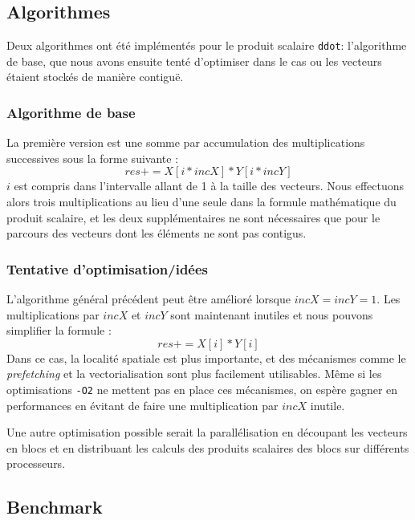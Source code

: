 \subsection{Algorithmes}

Deux algorithmes ont été implémentés pour le produit scalaire \texttt{ddot}: l'algorithme de base, que nous avons ensuite tenté d'optimiser dans le cas ou les vecteurs étaient stockés de manière contiguë.
    
\subsubsection{Algorithme de base}

La première version est une somme par accumulation des multiplications successives sous la forme suivante :
\begin{equation}
    res += X[i*incX]*Y[i*incY]
\end{equation}
$i$ est compris dans l'intervalle allant de 1 à la taille des vecteurs. Nous effectuons alors trois multiplications au lieu d'une seule dans la formule mathématique du produit scalaire, et les deux supplémentaires ne sont nécessaires que pour le parcours des vecteurs dont les éléments ne sont pas contigus.

\subsubsection{Tentative d'optimisation/idées}

L'algorithme général précédent peut être amélioré lorsque $incX = incY = 1$. Les multiplications par $incX$ et $incY$ sont maintenant inutiles et nous pouvons simplifier la formule :
\begin{equation}
    res += X[i]*Y[i]
\end{equation}
Dans ce cas, la localité spatiale est plus importante, et des mécanismes comme le \emph{prefetching} et la vectorialisation sont plus facilement utilisables. Même si les optimisations \texttt{-O2} ne mettent pas en place ces mécanismes, on espère gagner en performances en évitant de faire une multiplication par $incX$ inutile.
    
Une autre optimisation possible serait la parallélisation en découpant les vecteurs en blocs et en distribuant les calculs des produits scalaires des blocs sur différents processeurs.



\subsection{Benchmark}

